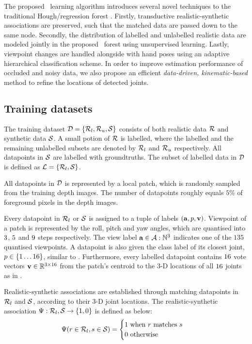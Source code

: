 The proposed \STR\ learning algorithm introduces several novel techniques to the traditional Hough/regression forest \cite{Gall_PAMI_11}. 
Firstly, transductive realistic-synthetic associations are preserved, such that the matched data are passed down to the same node.
Secondly, the distribution of labelled and unlabelled realistic data are modeled jointly in the proposed \STR\ forest using unsupervised learning. 
Lastly, viewpoint changes are handled alongside with hand poses using an adaptive hierarchical classification scheme.
In order to improve estimation performance of occluded and noisy data, we also propose an efficient \emph{data-driven, kinematic-based} method to refine the locations of detected joints.

\subsection{Training datasets}

The training dataset $\mathcal{D} = \{\mathcal{R}_{l}, \mathcal{R}_{u}, \mathcal{S}\}$ consists of both realistic data $\mathcal{R}$ and synthetic data $\mathcal{S}$. 
A small potion of $\mathcal{R}$ is labelled, where the labelled and the remaining unlabelled subsets are denoted by $\mathcal{R}_{l}$ and $\mathcal{R}_{u}$ respectively. All datapoints in $\mathcal{S}$ are labelled with groundtruths. The subset of labelled data in $\mathcal{D}$ is defined as $\mathcal{L} = \{\mathcal{R}_{l}, \mathcal{S}\}$.  

All datapoints in $\mathcal{D}$ is represented by a local patch, which is randomly sampled from the training depth images. The number of datapoints roughly equals $5\%$ of foreground pixels in the depth images. 

Every datapoint in $\mathcal{R}_{l}$ or $\mathcal{S}$ is assigned to a tuple of labels $( \mathbf{a}, p, \mathbf{v})$. Viewpoint of a patch is represented by the roll, pitch and yaw angles, which are quantised into $3$, $5$ and $9$ steps respectively. The view label $\mathbf{a} \in \mathcal{A}:\mathbb{N}^{3}$ indicates one of the $135$ quantised viewpoints. A datapoint is also given the class label of its closest joint, $p \in \{1\dots16\}$, similar to \cite{Shotton_CVPR_11}.   
Furthermore, every labelled datapoint contains $16$ vote vectors $\mathbf{v} \in \mathbb{R}^{3\times16}$ from the patch's centroid to the 3-D locations of all $16$ joints as in \cite{Gall_PAMI_11}. 

Realistic-synthetic associations are established through matching datapoints in $\mathcal{R}_{l}$ and $\mathcal{S}$, according to their 3-D joint locations.  The realistic-synthetic association $\mathrm{\Psi}: \mathcal{R}_{l},\mathcal{S} \rightarrow \{1,0\}$ is defined as below:
\begin{equation}
	\mathrm{\Psi}(r \in \mathcal{R}_{l}, s \in \mathcal{S}) =
		\begin{cases}
			1 \mbox{ when $r$ matches $s$} \\
			0 \mbox{ otherwise}
		\end{cases}
	\label{eq:association}
\end{equation}

